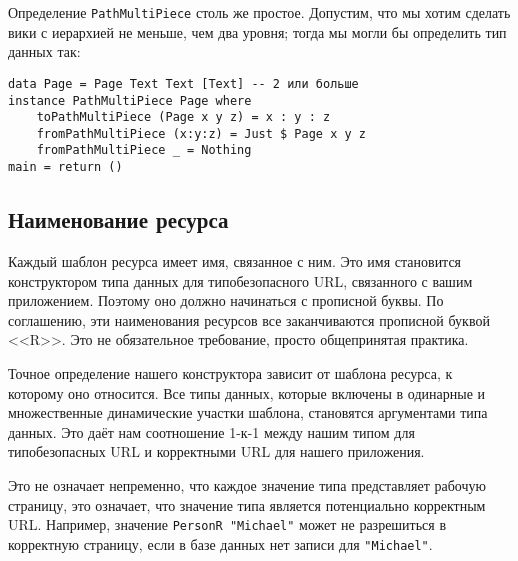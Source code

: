 
Определение \lstinline!PathMultiPiece! столь же простое. Допустим,
что мы хотим сделать вики с иерархией не меньше, чем два уровня;
тогда мы могли бы определить тип данных так:
\begin{lstlisting}
data Page = Page Text Text [Text] -- 2 или больше
instance PathMultiPiece Page where
    toPathMultiPiece (Page x y z) = x : y : z
    fromPathMultiPiece (x:y:z) = Just $ Page x y z
    fromPathMultiPiece _ = Nothing
main = return ()
\end{lstlisting}

\subsection{Наименование ресурса}
Каждый шаблон ресурса имеет имя, связанное с ним. Это имя становится
конструктором типа данных для типобезопасного URL, связанного с вашим
приложением. Поэтому оно должно начинаться с прописной буквы. По
соглашению, эти наименования ресурсов все заканчиваются прописной
буквой <<R>>. Это не обязательное требование, просто общепринятая
практика.

Точное определение нашего конструктора зависит от шаблона ресурса, к
которому оно относится. Все типы данных, которые включены в одинарные
и множественные динамические участки шаблона, становятся аргументами
типа данных. Это даёт нам соотношение 1-к-1 между нашим типом для
типобезопасных URL и корректными URL для нашего приложения.

\begin{minipage}[!h]{.9\linewidth}
Это не означает непременно, что каждое значение типа представляет
рабочую страницу, это означает, что значение типа является потенциально
корректным URL. Например, значение \lstinline!PersonR "Michael"! может
не разрешиться в корректную страницу, если в базе данных нет записи для
\lstinline!"Michael"!.
\end{minipage}

